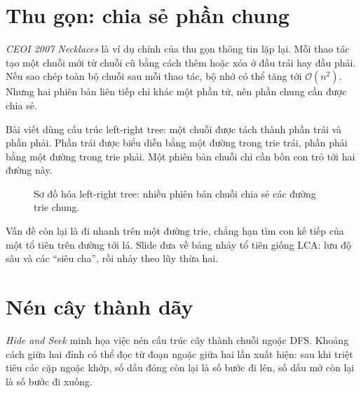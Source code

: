 \documentclass[11pt]{article}
\newcommand{\Oh}{\mathcal{O}}
\begin{document}
\section{Thu gọn: chia sẻ phần chung}

\textit{CEOI 2007 Necklaces} là ví dụ chính của thu gọn thông tin lặp lại. Mỗi
thao tác tạo một chuỗi mới từ chuỗi cũ bằng cách thêm hoặc xóa ở đầu trái hay
đầu phải. Nếu sao chép toàn bộ chuỗi sau mỗi thao tác, bộ nhớ có thể tăng tới
\(\Oh(n^2)\). Nhưng hai phiên bản liên tiếp chỉ khác một phần tử, nên phần
chung cần được chia sẻ.

Bài viết dùng cấu trúc left-right tree: một chuỗi được tách thành phần trái
và phần phải. Phần trái được biểu diễn bằng một đường trong trie trái, phần
phải bằng một đường trong trie phải. Một phiên bản chuỗi chỉ cần bốn con trỏ
tới hai đường này.

\begin{figure}[htbp]
\centering
{}
\caption{Sơ đồ hóa left-right tree: nhiều phiên bản chuỗi chia sẻ các đường trie chung.}
\end{figure}

Vấn đề còn lại là đi nhanh trên một đường trie, chẳng hạn tìm con kế tiếp của
một tổ tiên trên đường tới lá. Slide đưa về bảng nhảy tổ tiên giống LCA:
lưu độ sâu và các ``siêu cha'', rồi nhảy theo lũy thừa hai.

\section{Nén cây thành dãy}

\textit{Hide and Seek} minh họa việc nén cấu trúc cây thành chuỗi ngoặc DFS.
Khoảng cách giữa hai đỉnh có thể đọc từ đoạn ngoặc giữa hai lần xuất hiện:
sau khi triệt tiêu các cặp ngoặc khớp, số dấu đóng còn lại là số bước đi lên,
số dấu mở còn lại là số bước đi xuống.
\end{document}
